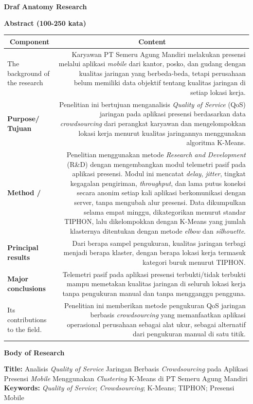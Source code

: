 \documentclass[11pt,a4paper]{article}
\newcommand{\judul}[1]{\begin{center}\textbf{\large #1}\end{center}}
\newcommand{\kepala}{\multicolumn{1}{|c|}{\textbf{Component}} & \multicolumn{1}{c|}{\textbf{Content}}\\ \hline}
\begin{document}
\judul{\Large Draf Anatomy Research}
\judul{Abstract (100-250 kata)}

\begin{longtable}{|L|R|}
\hline
\kepala
\endhead
The background of the research &
Karyawan PT Semeru Agung Mandiri melakukan presensi melalui aplikasi \textit{mobile} dari kantor, posko, dan gudang dengan kualitas jaringan yang berbeda-beda, tetapi perusahaan belum memiliki data objektif tentang kualitas jaringan di setiap lokasi kerja. \\ \hline
\textbf{Purpose/ Tujuan} &
Penelitian ini bertujuan menganalisis \textit{Quality of Service} (QoS) jaringan pada aplikasi presensi berdasarkan data \textit{crowdsourcing} dari perangkat karyawan dan mengelompokkan lokasi kerja menurut kualitas jaringannya menggunakan algoritma K-Means. \\ \hline
\textbf{Method /} &
Penelitian menggunakan metode \textit{Research and Development} (R\&D) dengan mengembangkan modul telemetri pasif pada aplikasi presensi. Modul ini mencatat \textit{delay}, \textit{jitter}, tingkat kegagalan pengiriman, \textit{throughput}, dan lama putus koneksi secara anonim setiap kali aplikasi berkomunikasi dengan server, tanpa mengubah alur presensi. Data dikumpulkan selama empat minggu, dikategorikan menurut standar TIPHON, lalu dikelompokkan dengan K-Means yang jumlah klasternya ditentukan dengan metode \textit{elbow} dan \textit{silhouette}. \\ \hline
\textbf{Principal results} &
Dari berapa sampel pengukuran, kualitas jaringan terbagi menjadi berapa klaster, dengan berapa lokasi kerja termasuk kategori buruk menurut TIPHON. \\ \hline
\textbf{Major conclusions} &
Telemetri pasif pada aplikasi presensi terbukti/tidak terbukti mampu memetakan kualitas jaringan di seluruh lokasi kerja tanpa pengukuran manual dan tanpa mengganggu pengguna. \\ \hline
Its contributions to the field. &
Penelitian ini memberikan metode pengukuran QoS jaringan berbasis \textit{crowdsourcing} yang memanfaatkan aplikasi operasional perusahaan sebagai alat ukur, sebagai alternatif dari pengukuran manual di satu titik. \\ \hline
\end{longtable}

\judul{Body of Research}

\textbf{Title:} Analisis \textit{Quality of Service} Jaringan Berbasis \textit{Crowdsourcing} pada Aplikasi Presensi \textit{Mobile} Menggunakan \textit{Clustering} K-Means di PT Semeru Agung Mandiri\\
\textbf{Keywords:} \textit{Quality of Service}; \textit{Crowdsourcing}; K-Means; TIPHON; Presensi Mobile
\end{document}
